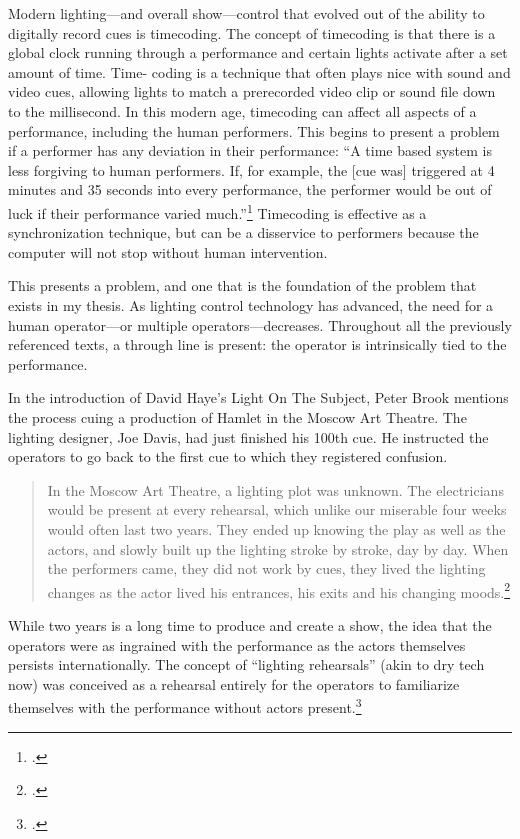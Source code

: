 \documentclass[
    12pt,
    twoside,
    bibstyle=chicago,
    headerstyle=uppercase,
	bibfile=biblatex_updating.bib
]{reedthesis}
\begin{document}
Modern lighting---and overall show---control that evolved out of the ability to digitally record cues is timecoding. The concept of timecoding is that there is a global clock running through a performance and certain lights activate after a set amount of time. Time- coding is a technique that often plays nice with sound and video cues, allowing lights to match a prerecorded video clip or sound file down to the millisecond. In this modern age, timecoding can affect all aspects of a performance, including the human performers. This begins to present a problem if a performer has any deviation in their performance: “A time based system is less forgiving to human performers. If, for example, the [cue was] triggered at 4 minutes and 35 seconds into every performance, the performer would be out of luck if their performance varied much.”\footcite[p. 7]{huntingtonIntroductionShowControl2023} Timecoding is effective as a synchronization technique, but can be a disservice to performers because the computer will not stop without human intervention. 

This presents a problem, and one that is the foundation of the problem that exists in my thesis. As lighting control technology has advanced, the need for a human operator---or multiple operators---decreases. Throughout all the previously referenced texts, a through line is present: the operator is intrinsically tied to the performance.

In the introduction of David Haye's Light On The Subject, Peter Brook mentions the process cuing a production of Hamlet in the Moscow Art Theatre. The lighting designer, Joe Davis, had just finished his 100th cue. He instructed the operators to go back to the first cue to which they registered confusion.

\begin{quote}
In the Moscow Art Theatre, a lighting plot was unknown. The electricians would be present at every rehearsal, which unlike our miserable four weeks would often last two years. They ended up knowing the play as well as the actors, and slowly built up the lighting stroke by stroke, day by day. When the performers came, they did not work by cues, they lived the lighting changes as the actor lived his entrances, his exits and his changing moods.\footcite[p. 1]{haysLightSubjectStage1989}
\end{quote}

While two years is a long time to produce and create a show, the idea that the operators were as ingrained with the performance as the actors themselves persists internationally. The concept of “lighting rehearsals” (akin to dry tech now) was conceived as a rehearsal entirely for the operators to familiarize themselves with the performance without actors present.\footcite[p. 252]{benthamStageLighting1980}
\end{document}
